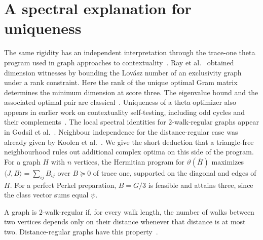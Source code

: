 \documentclass[11pt]{article}
\begin{document}
\section{A spectral explanation for uniqueness}
The same rigidity has an independent interpretation through the trace-one theta program used in graph approaches to contextuality~\cite{csw,lovasz}. Ray et al.~\cite{ray} obtained dimension witnesses by bounding the Lov\'asz number of an exclusivity graph under a rank constraint. Here the rank of the unique optimal Gram matrix determines the minimum dimension at score three. The eigenvalue bound and the associated optimal pair are classical~\cite{lovasz,godsil}. Uniqueness of a theta optimizer also appears in earlier work on contextuality self-testing, including odd cycles and their complements~\cite{bharti}. The local spectral identities for $2$-walk-regular graphs appear in Godsil et al.~\cite[Lemma~3.11 and Eq.~(13)]{local}. Neighbour independence for the distance-regular case was already given by Koolen et al.~\cite[Lemma~3.1(ii)]{koolen}. We give the short deduction that a triangle-free neighbourhood rules out additional complex optima on this side of the program. For a graph $H$ with $n$ vertices, the Hermitian program for $\vartheta(\overline H)$ maximizes $\langle J,B\rangle=\sum_{ij}B_{ij}$ over $B\succeq0$ of trace one, supported on the diagonal and edges of $H$. For a perfect Perkel preparation, $B=G/3$ is feasible and attains three, since the class vector sums equal $\psi$.

A graph is $2$-walk-regular if, for every walk length, the number of walks between two vertices depends only on their distance whenever that distance is at most two. Distance-regular graphs have this property~\cite{bcn}.
\end{document}
